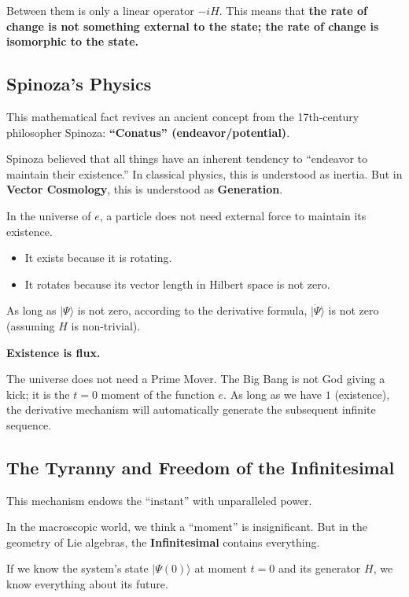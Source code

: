 Between them is only a linear operator $-iH$. This means that \textbf{the rate of change is not something external to the state; the rate of change is isomorphic to the state.}

\subsection{Spinoza's Physics}

This mathematical fact revives an ancient concept from the 17th-century philosopher Spinoza: \textbf{``Conatus'' (endeavor/potential)}.

Spinoza believed that all things have an inherent tendency to ``endeavor to maintain their existence.'' In classical physics, this is understood as inertia. But in \textbf{Vector Cosmology}, this is understood as \textbf{Generation}.

In the universe of $e$, a particle does not need external force to maintain its existence.

\begin{itemize}
\item It exists because it is rotating.

\item It rotates because its vector length in Hilbert space is not zero.
\end{itemize}

As long as $|\Psi\rangle$ is not zero, according to the derivative formula, $|\dot{\Psi}\rangle$ is not zero (assuming $H$ is non-trivial).

\textbf{Existence is flux.}

The universe does not need a Prime Mover. The Big Bang is not God giving a kick; it is the $t=0$ moment of the function $e$. As long as we have $1$ (existence), the derivative mechanism will automatically generate the subsequent infinite sequence.

\subsection{The Tyranny and Freedom of the Infinitesimal}

This mechanism endows the ``instant'' with unparalleled power.

In the macroscopic world, we think a ``moment'' is insignificant. But in the geometry of Lie algebras, the \textbf{Infinitesimal} contains everything.

If we know the system's state $|\Psi(0)\rangle$ at moment $t=0$ and its generator $H$, we know everything about its future.

